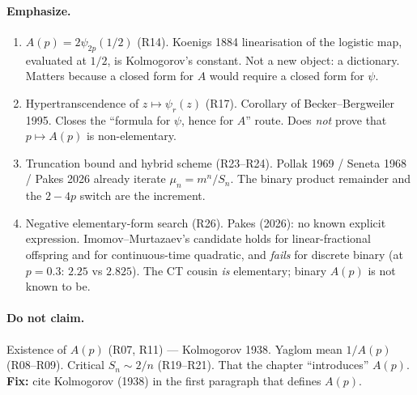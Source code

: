 \documentclass[11pt,a4paper]{report}
\begin{document}
\paragraph{Emphasize.}
\begin{enumerate}
\item \(A(p)=2\psi_{2p}(1/2)\) (R14). Koenigs 1884 linearisation of the
  logistic map, evaluated at \(1/2\), is Kolmogorov's constant. Not a new
  object: a dictionary. Matters because a closed form for \(A\) would
  require a closed form for \(\psi\).
\item Hypertranscendence of \(z\mapsto\psi_r(z)\) (R17). Corollary of
  Becker--Bergweiler 1995. Closes the ``formula for \(\psi\), hence for
  \(A\)'' route. Does \emph{not} prove that \(p\mapsto A(p)\) is
  non-elementary.
\item Truncation bound and hybrid scheme (R23--R24). Pollak 1969 /
  Seneta 1968 / Pakes 2026 already iterate \(\mu_n=m^n/S_n\). The binary
  product remainder and the \(2{-}4p\) switch are the increment.
\item Negative elementary-form search (R26). Pakes (2026): no known
  explicit expression. Imomov--Murtazaev's candidate holds for
  linear-fractional offspring and for continuous-time quadratic, and
  \emph{fails} for discrete binary (at \(p=0.3\): \(2.25\) vs \(2.825\)).
  The CT cousin \emph{is} elementary; binary \(A(p)\) is not known to be.
\end{enumerate}

\paragraph{Do not claim.}
Existence of \(A(p)\) (R07, R11) --- Kolmogorov 1938. Yaglom mean
\(1/A(p)\) (R08--R09). Critical \(S_n\sim 2/n\) (R19--R21). That the
chapter ``introduces'' \(A(p)\). \textbf{Fix:} cite Kolmogorov (1938) in
the first paragraph that defines \(A(p)\).
\end{document}
